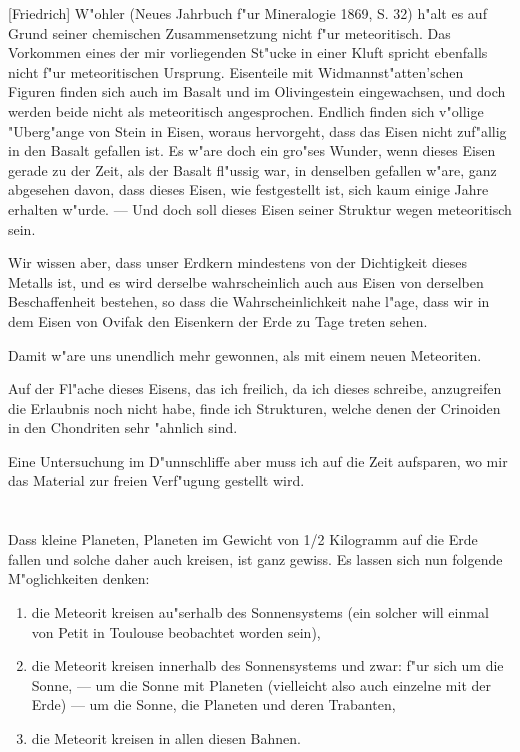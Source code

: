 \documentclass[a4paper, 11pt, oneside]{article}
\begin{document}
[Friedrich] W"ohler (Neues Jahrbuch f"ur Mineralogie 1869, S. 32) h"alt es auf Grund seiner chemischen Zusammensetzung nicht f"ur meteoritisch. Das Vorkommen eines der mir vorliegenden St"ucke in einer Kluft spricht ebenfalls nicht f"ur meteoritischen Ursprung. Eisenteile mit Widmannst"atten'schen Figuren finden sich auch im Basalt und im Olivingestein eingewachsen, und doch werden beide nicht als meteoritisch angesprochen. Endlich finden sich v"ollige "Uberg"ange von Stein in Eisen, woraus hervorgeht, dass das Eisen nicht zuf"allig in den Basalt gefallen ist. Es w"are doch ein gro"ses Wunder, wenn dieses Eisen gerade zu der Zeit, als der Basalt fl"ussig war, in denselben gefallen w"are, ganz abgesehen davon, dass dieses Eisen, wie festgestellt ist, sich kaum einige Jahre erhalten w"urde. --- Und doch soll dieses Eisen seiner Struktur wegen meteoritisch sein.

Wir wissen aber, dass unser Erdkern mindestens von der Dichtigkeit dieses Metalls ist, und es wird derselbe wahrscheinlich auch aus Eisen von derselben Beschaffenheit bestehen, so dass die Wahrscheinlichkeit nahe l"age, dass wir in dem Eisen von Ovifak den Eisenkern der Erde zu Tage treten sehen.

Damit w"are uns unendlich mehr gewonnen, als mit einem neuen Meteoriten.

Auf der Fl"ache dieses Eisens, das ich freilich, da ich dieses schreibe, anzugreifen die Erlaubnis noch nicht habe, finde ich Strukturen, welche denen der Crinoiden in den Chondriten sehr "ahnlich sind.

Eine Untersuchung im D"unnschliffe aber muss ich auf die Zeit aufsparen, wo mir das Material zur freien Verf"ugung gestellt wird.
\clearpage
\section{}
\subsection{}
\paragraph{}
Dass kleine Planeten, Planeten im Gewicht von 1/2 Kilogramm auf die Erde fallen und solche daher auch kreisen, ist ganz gewiss. Es lassen sich nun folgende M"oglichkeiten denken:
\begin{enumerate}
\item die Meteorit kreisen au"serhalb des Sonnensystems (ein solcher will einmal von Petit in Toulouse beobachtet worden sein),
\item die Meteorit kreisen innerhalb des Sonnensystems und zwar: f"ur sich um die Sonne, --- um die Sonne mit Planeten (vielleicht also auch einzelne mit der Erde) --- um die Sonne, die Planeten und deren Trabanten,
\item die Meteorit kreisen in allen diesen Bahnen.
\end{enumerate}
\end{document}

